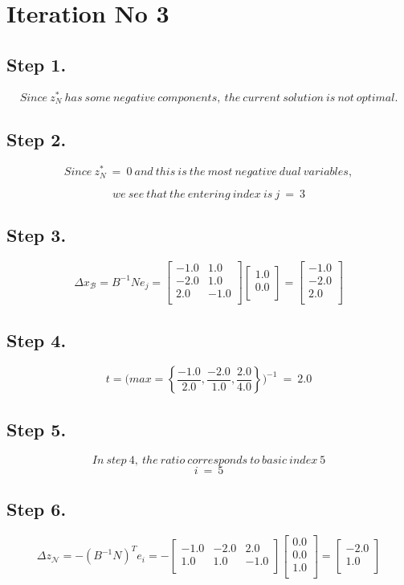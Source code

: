 \section*{Iteration No 3}
\subsection{Step 1.}
\[
Since\ z_\mathit{N}^*\ has\ some\ negative\ components,\ the\ current\ solution\ is\ not\ optimal.
\]
\subsection{Step 2.}
\[
Since\ z_\mathit{N}^*\ = \ 0\ and\ this\ is\ the\ most\ negative\ dual\ variables,
\]

\[
we\ see\ that\ the\ entering\ index\ is\  j\ =\ 3
\]
\subsection{Step 3.}
\[
\Delta x_{\mathcal B} = B^{-1} N e_j =
\begin{bmatrix}
-1.0 & 1.0 \\ -2.0 & 1.0 \\ 2.0 & -1.0 \\ 
\end{bmatrix}
\begin{bmatrix}
1.0 \\ 0.0 \\ 
\end{bmatrix}
= \begin{bmatrix}
-1.0 \\ -2.0 \\ 2.0 \\ 
\end{bmatrix}
\]
\subsection{Step 4.}
\[
t =\Bigg(
max= \left\{\frac{-1.0}{2.0},\frac{-2.0}{1.0},\frac{2.0}{4.0}\right\}
\Bigg)^{-1}\ =\ 2.0
\]
\subsection{Step 5.}
\[
In\ step\ 4, \ the\ ratio\ corresponds\ to\ basic\ index\ 5
\]
\[
i\ = \ 5
\]
\subsection{Step 6.}
\[
\Delta z_{\mathcal N}= -( B^{-1} N )^{T}e_i = -\begin{bmatrix}
-1.0 & -2.0 & 2.0 \\ 1.0 & 1.0 & -1.0 \\ 
\end{bmatrix}
\begin{bmatrix}
0.0 \\ 0.0 \\ 1.0 \\ 
\end{bmatrix}
= \begin{bmatrix}
-2.0 \\ 1.0 \\ 
\end{bmatrix}
\]
